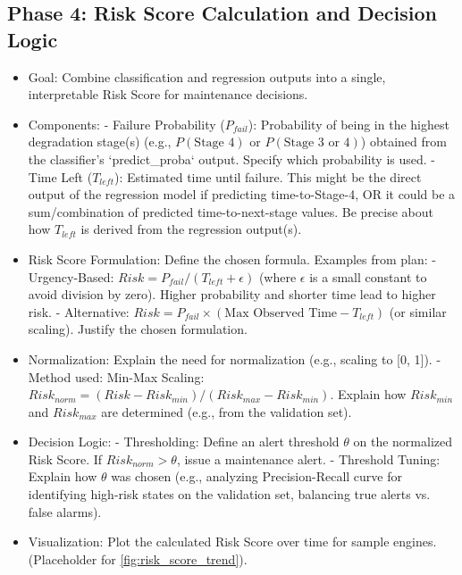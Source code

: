 \subsection{Phase 4: Risk Score Calculation and Decision Logic}
\label{subsec:risk_score}
\begin{itemize}
    \item Goal: Combine classification and regression outputs into a single, interpretable Risk Score for maintenance decisions.
    \item Components:
        - Failure Probability ($P_{fail}$): Probability of being in the highest degradation stage(s) (e.g., $P(\text{Stage 4})$ or $P(\text{Stage 3 or 4})$) obtained from the classifier's `predict_proba` output. Specify which probability is used.
        - Time Left ($T_{left}$): Estimated time until failure. This might be the direct output of the regression model if predicting time-to-Stage-4, OR it could be a sum/combination of predicted time-to-next-stage values. Be precise about how $T_{left}$ is derived from the regression output(s).
    \item Risk Score Formulation: Define the chosen formula. Examples from plan:
        - Urgency-Based: $Risk = P_{fail} / (T_{left} + \epsilon)$ (where $\epsilon$ is a small constant to avoid division by zero). Higher probability and shorter time lead to higher risk.
        - Alternative: $Risk = P_{fail} \times (\text{Max Observed Time} - T_{left})$ (or similar scaling). Justify the chosen formulation.
    \item Normalization: Explain the need for normalization (e.g., scaling to [0, 1]).
        - Method used: Min-Max Scaling: $Risk_{norm} = (Risk - Risk_{min}) / (Risk_{max} - Risk_{min})$. Explain how $Risk_{min}$ and $Risk_{max}$ are determined (e.g., from the validation set).
    \item Decision Logic:
        - Thresholding: Define an alert threshold $\theta$ on the normalized Risk Score. If $Risk_{norm} > \theta$, issue a maintenance alert.
        - Threshold Tuning: Explain how $\theta$ was chosen (e.g., analyzing Precision-Recall curve for identifying high-risk states on the validation set, balancing true alerts vs. false alarms).
    \item Visualization: Plot the calculated Risk Score over time for sample engines. (Placeholder for \cref{fig:risk_score_trend}).
\end{itemize}



